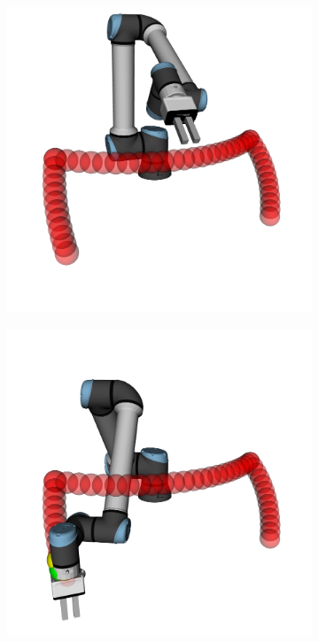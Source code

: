 \begin{figure}[h]
    \centering
    \begin{subfigure}{.2\linewidth}
      \centering
      \includegraphics[width=\linewidth]{figs/chp4/trajectory_0.png}
    \end{subfigure}%
    \begin{subfigure}{.2\linewidth}
      \centering
      \includegraphics[width=\linewidth]{figs/chp4/trajectory_1.png}

\end{subfigure}
\end{figure}
